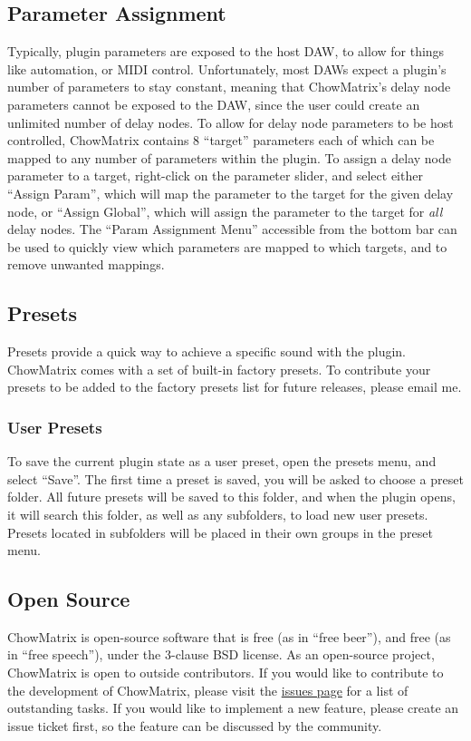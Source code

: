 \documentclass[landscape,twocolumn,a5paper]{manual}
\begin{document}
\subsection{Parameter Assignment}
Typically, plugin parameters are exposed to the host DAW,
to allow for things like automation, or MIDI control.
Unfortunately, most DAWs expect a plugin's number of
parameters to stay constant, meaning that ChowMatrix's
delay node parameters cannot be exposed to the DAW,
since the user could create an unlimited number of
delay nodes.
\newpar
To allow for delay node parameters to be host controlled,
ChowMatrix contains 8 ``target'' parameters each of which
can be mapped to any number of parameters within the plugin.
\newpar
To assign a delay node parameter to a target, right-click
on the parameter slider, and select either ``Assign Param'',
which will map the parameter to the target for the given delay
node, or ``Assign Global'', which will assign the parameter to
the target for \emph{all} delay nodes.
The ``Param Assignment Menu'' accessible from the bottom bar
can be used to quickly view which parameters are mapped to
which targets, and to remove unwanted mappings.

\subsection{Presets}
Presets provide a quick way to achieve a specific sound
with the plugin. ChowMatrix comes with a set of built-in
factory presets. To contribute your presets to be added
to the factory presets list for future releases, please
email me.

\subsubsection{User Presets}
To save the current plugin state as a user preset, open
the presets menu, and select ``Save''. The first time a
preset is saved, you will be asked to choose a preset
folder. All future presets will be saved to this folder,
and when the plugin opens, it will search this folder, as
well as any subfolders, to load new user presets.
Presets located in subfolders will be placed in their
own groups in the preset menu.

\subsection{Open Source}
ChowMatrix is open-source software that is free (as in ``free
beer''), and free (as in ``free speech''), under the
3-clause BSD license.
\newpar
As an open-source project, ChowMatrix is
open to outside contributors. If you would like to contribute
to the development of ChowMatrix, please visit the
\href{https://github.com/Chowdhury-DSP/ChowMatrix/issues}{issues page}
for a list of outstanding tasks. If you would like to implement
a new feature, please create an issue ticket first, so the
feature can be discussed by the community.
\end{document}
